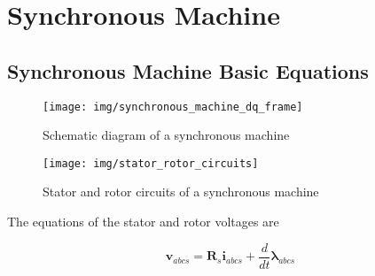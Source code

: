 \section{Synchronous Machine}

\subsection{Synchronous Machine Basic Equations}

\begin{figure}
	\centering
	\texttt{[image: img/synchronous\_machine\_dq\_frame]} 
	\caption{Schematic diagram of a synchronous machine}
	\label{fig:syn_machine_dq_frame}
\end{figure}

\begin{figure}
	\centering
	\texttt{[image: img/stator\_rotor\_circuits]} 
	\caption{Stator and rotor circuits of a synchronous machine}
	\label{fig:	stator_rotor_circuits}
\end{figure}

The equations of the stator and rotor voltages are

\begin{equation} 
	\mathbf{v}_{abcs} = \mathbf{R}_s \mathbf{i}_{abcs} + \frac{d}{dt} \boldsymbol{\lambda}_{abcs}
	\label{eq:voltage_stator}
\end{equation}

